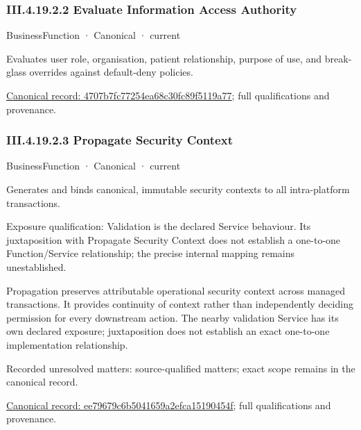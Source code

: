 \subsubsection*{III.4.19.2.2 Evaluate Information Access Authority}
\label{navigation:III.4.19.2.2}

\label{element:4707b7fc77254ea68c30fc89f5119a77}
{\small BusinessFunction · Canonical · current}\par

Evaluates user role, organisation, patient relationship, purpose of use, and break-glass overrides against default-deny policies.


{\footnotesize \href{../../../../continuum/business/business-function/4707b7fc77254ea68c30fc89f5119a77.md}{Canonical record: 4707b7fc77254ea68c30fc89f5119a77}; full qualifications and provenance.}\par
\subsubsection*{III.4.19.2.3 Propagate Security Context}
\label{navigation:III.4.19.2.3}

\label{element:ee79679c6b5041659a2efca15190454f}
{\small BusinessFunction · Canonical · current}\par

Generates and binds canonical, immutable security contexts to all intra-platform transactions.



Exposure qualification: Validation is the declared Service behaviour. Its juxtaposition with Propagate Security Context does not establish a one-to-one Function/Service relationship; the precise internal mapping remains unestablished.



Propagation preserves attributable operational security context across managed transactions. It provides continuity of context rather than independently deciding permission for every downstream action. The nearby validation Service has its own declared exposure; juxtaposition does not establish an exact one-to-one implementation relationship.


{\small Recorded unresolved matters: source-qualified matters; exact scope remains in the canonical record.}\par
{\footnotesize \href{../../../../continuum/business/business-function/ee79679c6b5041659a2efca15190454f.md}{Canonical record: ee79679c6b5041659a2efca15190454f}; full qualifications and provenance.}\par
